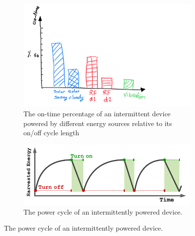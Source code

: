 
\begin{figure}
	\centering
	\begin{subfigure}{\columnwidth}
		\includegraphics[width=\columnwidth]{figures/intermittent_problem}
		\caption{The on-time percentage of an intermittent device powered by different energy sources relative to its on/off cycle length}
		\label{fig:disInterSys}
	\end{subfigure}
	\begin{subfigure}{\columnwidth}
		\includegraphics[width=\columnwidth]{figures/PowerCycleIntermittentSystem}
		\caption{The power cycle of an intermittently powered device.}
		\label{fig:powerCycle}
	\end{subfigure}
\end{figure}
%

